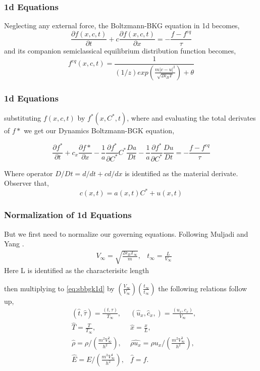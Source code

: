 \begin{frame}
	\frametitle{1d Equations}
	Neglecting any external force, the Boltzmann-BKG equation in 1d becomes,
	\begin{equation}
	\frac{\partial f(x,c,t)}{\partial t} + c \frac{\partial f(x,c,t)}{\partial x} = -\frac{f - f^{eq}}{\tau}
	\end{equation}
	and its companion semiclassical equilibrium distribution function becomes,
	\begin{equation}
	f^{eq} (x,c,t) = \frac{1}{(1/z) exp( \frac{ m \left | c - u \right |^2}{\sqrt{2 k_B T}} )+\theta}
	\end{equation}
\end{frame}

\begin{frame}
	\frametitle{1d Equations}
	substituting $f(x,c,t)$ by $f^*(x,C^*,t)$, where and evaluating the total derivates of $f*$ we get our Dynamics Boltzmann-BGK equation,
	
	\begin{equation}
	\frac{\partial f^*}{\partial t} + c_x \frac{\partial f*}{\partial x} 
		- \frac{1}{a} \frac{\partial f^*}{\partial C^*} C^* \frac{Da}{Dt}
		- \frac{1}{a} \frac{\partial f^*}{\partial C^*} \frac{Du}{Dt}
		= -\frac{f - f^{eq}}{\tau}
		\label{eq:sbbgk1d}
	\end{equation}
	
	Where operator $D/Dt = d/dt + c d/dx$ is identified as the material derivate. Observer that, 
	\begin{equation}
		c(x,t) = a(x,t) C^* + u(x,t)
	\end{equation}
	
\end{frame}

\begin{frame}
	\frametitle{Normalization of 1d Equations}
	But we first need to normalize our governing equations. Following Muljadi and Yang \cite{Yang2013}.
	\begin{align*}
	&V_\infty = \sqrt{\frac{2k_BT_\infty}{m}}, &t_\infty = \frac{L}{V_\infty}
	\end{align*}
	Here L is identified as the characterisitc length
\end{frame}

\begin{frame}
	then multiplying to \ref{eq:sbbgk1d} by $(\frac{V_\infty}{V_\infty})(\frac{t_\infty}{t_\infty})$ the following relations follow up,
	\begin{align*}
	&(\hat t, \hat \tau) = \frac{(t,\tau)}{T_\infty}, &(\hat u_x,\hat c_x,) = \frac{(u_x,c_x)}{V_\infty}, \\
	&\hat T = \frac{T}{T_\infty}, &\hat x = \frac{x}{L}, \\
	&\hat \rho = \rho / \left(\frac{m^2V_\infty^2}{h^2} \right ), &\hat {\rho u_x} = \rho u_x / \left(\frac{m^2V_\infty^3}{h^2} \right ), \\
	&\hat E = E / \left(\frac{m^3V_\infty^4}{h^2} \right ), &\hat f = f.
	\end{align*}
\end{frame}

